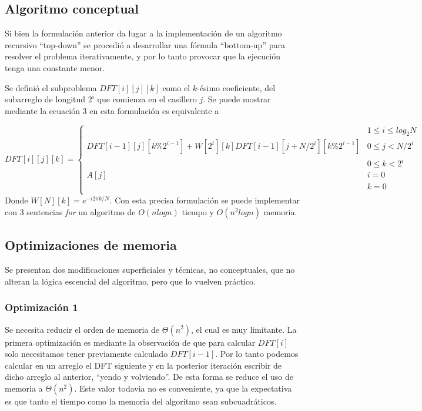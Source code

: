 \documentclass[assd_tp2_main.tex]{subfiles}
\begin{document}
\subsection{Algoritmo conceptual}
Si bien la formulación anterior da lugar a la implementación de un algoritmo recursivo ``top-down'' se procedió a desarrollar una fórmula ``bottom-up'' para resolver el problema iterativamente, y por lo tanto provocar que la ejecución tenga una constante menor.

Se definió el subproblema $DFT[i][j][k]$ como el $k$-ésimo coeficiente, del subarreglo de longitud $2^i$ que comienza en el casillero $j$. Se puede mostrar mediante la ecuación 3 en esta formulación es equivalente a

\begin{equation}
	DFT[i][j][k] = \begin{cases}
		 & 1\leq i \leq log_2{N} \\ DFT[i-1][j][k\%2^{i-1}] + W[2^i][k] DFT[i-1][j+N/2^{i}][k\%2^{i-1}] & 0\leq j < N/2^i \\ & 0\leq k<2^i \\
		A[j] & i = 0 \\ & k = 0 \\
\end{cases}
\end{equation}
Donde $W[N][k]=e^{-i2\pi k / N}$.
Con esta precisa formulación se puede implementar con 3 sentencias \textit{for} un algoritmo de $O(nlog n)$ tiempo y $O(n^2log n)$ memoria.

\subsection{Optimizaciones de memoria}
Se presentan dos modificaciones superficiales y técnicas, no conceptuales, que no alteran la lógica escencial del algoritmo, pero que lo vuelven práctico.
\subsubsection{Optimización 1}
Se necesita reducir el orden de memoria de $\Theta(n^2)$, el cual es muy limitante. La primera optimización es mediante la observación de que para calcular $DFT[i]$ solo necesitamos tener previamente calculado $DFT[i-1]$. Por lo tanto podemos calcular en un arreglo el DFT siguiente y en la posterior iteración escribir de dicho arreglo al anterior, ``yendo y volviendo''. De esta forma se reduce el uso de memoria a $\Theta(n^2)$. Este valor todavia no es conveniente, ya que la expectativa es que tanto el tiempo como la memoria del algoritmo sean subcuadráticos.
\end{document}
